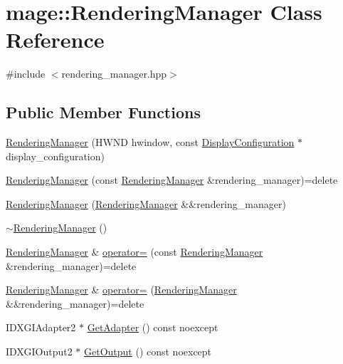 \hypertarget{classmage_1_1_rendering_manager}{}\section{mage\+:\+:Rendering\+Manager Class Reference}
\label{classmage_1_1_rendering_manager}


{\ttfamily \#include $<$rendering\+\_\+manager.\+hpp$>$}

\subsection*{Public Member Functions}
\begin{DoxyCompactItemize}
\item 
\hyperlink{classmage_1_1_rendering_manager_aaff7375b93bf6019ff7aafb845b1a7a0}{Rendering\+Manager} (H\+W\+ND hwindow, const \hyperlink{structmage_1_1_display_configuration}{Display\+Configuration} $\ast$display\+\_\+configuration)
\item 
\hyperlink{classmage_1_1_rendering_manager_a662f30a01e5e0f1b95f2877981a2f1df}{Rendering\+Manager} (const \hyperlink{classmage_1_1_rendering_manager}{Rendering\+Manager} \&rendering\+\_\+manager)=delete
\item 
\hyperlink{classmage_1_1_rendering_manager_af3645720626dc0151fdec80097e0364b}{Rendering\+Manager} (\hyperlink{classmage_1_1_rendering_manager}{Rendering\+Manager} \&\&rendering\+\_\+manager)
\item 
\hyperlink{classmage_1_1_rendering_manager_a4164e70f014de8d0348c35d5142cedab}{$\sim$\+Rendering\+Manager} ()
\item 
\hyperlink{classmage_1_1_rendering_manager}{Rendering\+Manager} \& \hyperlink{classmage_1_1_rendering_manager_af34a5ba3b8b585124f84f4c70866546b}{operator=} (const \hyperlink{classmage_1_1_rendering_manager}{Rendering\+Manager} \&rendering\+\_\+manager)=delete
\item 
\hyperlink{classmage_1_1_rendering_manager}{Rendering\+Manager} \& \hyperlink{classmage_1_1_rendering_manager_a6f71bc364063de61d07490ef9896158c}{operator=} (\hyperlink{classmage_1_1_rendering_manager}{Rendering\+Manager} \&\&rendering\+\_\+manager)=delete
\item 
I\+D\+X\+G\+I\+Adapter2 $\ast$ \hyperlink{classmage_1_1_rendering_manager_a571d71069797cd6040f48646d8ce6896}{Get\+Adapter} () const noexcept
\item 
I\+D\+X\+G\+I\+Output2 $\ast$ \hyperlink{classmage_1_1_rendering_manager_afc4c28f24e25635c305fd7709acf4e7f}{Get\+Output} () const noexcept

\end{DoxyCompactItemize}
